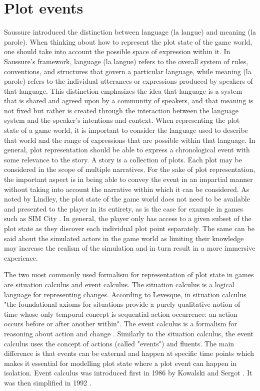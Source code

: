 
\section{Plot events}

Saussure introduced the distinction between language (la langue) and meaning (la parole)\cite{gordon2004langue}.
When thinking about how to represent the plot state of the game world, one should take into account the possible space of expression within it.
%
In Saussure's framework, language (la langue) refers to the overall system of rules, conventions, and structures that govern a particular language, while meaning (la parole) refers to the individual utterances or expressions produced by speakers of that language.
This distinction emphasizes the idea that language is a system that is shared and agreed upon by a community of speakers, and that meaning is not fixed but rather is created through the interaction between the language system and the speaker's intentions and context.
When representing the plot state of a game world, it is important to consider the language used to describe that world and the range of expressions that are possible within that language.
%
In general, plot representation should be able to express a chronological event with some relevance to the story.
A story is a collection of plots.
Each plot may be considered in the scope of multiple narratives.
For the sake of plot representation, the important aspect is in being able to convey the event in an impartial manner without taking into account the narrative within which it can be considered.
As noted by Lindley, the plot state of the game world does not need to be available and presented to the player in its entirety, as is the case for example in games such as SIM City \cite{lindley2005story}.
In general, the player only has access to a given subset of the plot state as they discover each individual plot point separately.
The same can be said about the simulated actors in the game world as limiting their knowledge may increase the realism of the simulation and in turn result in a more immersive experience.

The two most commonly used formalism for representation of plot state in games are situation calculus and event calculus.
The situation calculus is a logical language for representing changes\cite{lin2008situation}.
According to Levesque, in situation calculus "the foundational axioms for situations provide a purely qualitative notion of time whose only temporal concept is sequential action occurrence: an action occurs before or after another within"\cite{levesque1998foundations}.
The event calculus is a formalism for reasoning about action and change \cite{mueller2008event}.
Similarly to the situation calculus, the event calculus uses the concept of actions (called "events") and fluents.
The main difference is that events can be external and happen at specific time points which makes it essential for modelling plot state where a plot event can happen in isolation.
Event calculus was introduced first in 1986 by Kowalski and Sergot \cite{kowalski1986logic}.
It was then simplified in 1992 \cite{kakas1992abductive}.

